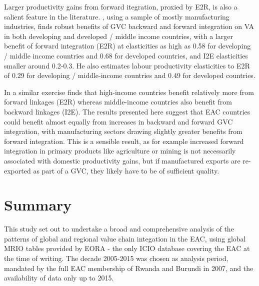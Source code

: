 \documentclass[a4paper]{article}
\begin{document}
Larger productivity gains from forward itegration, proxied by E2R, is also a salient feature in the literature. \citet{Kummritz20161}, using a sample of mostly manufacturing industries, finds robust benefits of GVC backward and forward integration on VA in both developing and developed / middle income countries, with a larger benefit of forward integration (E2R) at elasticities as high as 0.58 for developing / middle income countries and 0.68 for developed countries, and I2E elasticities smaller around 0.2-0.3. He also estimates labour productivity elasticities to E2R of 0.29 for developing / middle-income countries and 0.49 for developed countries. \newline 

In a similar exercise \citet{kummritz2015global} finds that high-income countries benefit relatively more from forward linkages (E2R) whereas middle-income countries also benefit from backward linkages (I2E). The results presented here suggest that EAC countries could benefit almost equally from increases in backward and forward GVC integration, with manufacturing sectors drawing slightly greater benefits from forward integration. 
This is a sensible result, as for example increased forward integration in primary products like agriculture or mining is not necessarily associated with domestic productivity gains, but if manufactured exports are re-exported as part of a GVC, they likely have to be of sufficient quality.  \newline 




\section{Summary}

This study set out to undertake a broad and comprehensive analysis of the patterns of global and regional value chain integation in the EAC, using global MRIO tables provided by EORA - the only ICIO database covering the EAC at the time of writing. The decade 2005-2015 was chosen as analysis period, mandated by the full EAC membership of Rwanda and Burundi in 2007, and the availability of data only up to 2015. \newline
\end{document}
